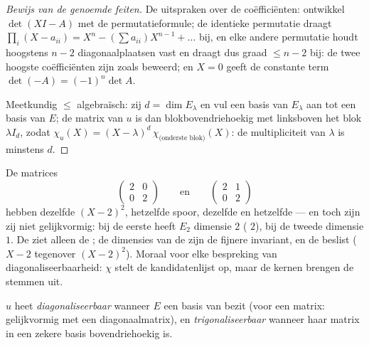 \begin{proof}[Bewijs van de genoemde feiten]
De uitspraken over de coëfficiënten: ontwikkel $\det(XI - A)$ met
de permutatieformule; de identieke permutatie draagt $\prod_i (X -
a_{ii}) = X^n - (\sum a_{ii})X^{n-1} + \dots$ bij, en elke andere
permutatie houdt hoogstens $n - 2$ diagonaalplaatsen vast en draagt
dus graad $\leq n - 2$ bij: de twee hoogste coëfficiënten zijn
zoals beweerd; en $X = 0$ geeft de constante term $\det(-A) =
(-1)^n\det A$.

Meetkundig $\leq$ algebraïsch: zij $d = \dim E_\lambda$ en vul een
basis van $E_\lambda$ aan tot een basis van $E$; de matrix van $u$
is dan blokbovendriehoekig met linksboven het blok $\lambda I_d$,
zodat $\chi_u(X) = (X - \lambda)^d\, \chi_{\text{(onderste
blok)}}(X)$: de multipliciteit van $\lambda$ is minstens $d$.
\end{proof}

\begin{example}\label{ex:b2:reduction:samechi}
De matrices
\[
\begin{pmatrix}2 & 0\\ 0 & 2\end{pmatrix}
\qquad\text{en}\qquad
\begin{pmatrix}2 & 1\\ 0 & 2\end{pmatrix}
\]
hebben dezelfde  $(X - 2)^2$, hetzelfde
spoor, dezelfde  en hetzelfde  --- en toch zijn
zij niet gelijkvormig: bij de eerste heeft $E_2$ dimensie $2$
( $2$), bij de tweede dimensie $1$. De
 ziet alleen de ; de dimensies van de  zijn de fijnere
invariant, en de  beslist ($X - 2$ tegenover $(X -
2)^2$). Moraal voor elke bespreking van diagonaliseerbaarheid:
$\chi$ stelt de kandidatenlijst op, maar de kernen brengen de
stemmen uit.
\end{example}

\begin{definition}\label{def:b2:reduction:diag}
$u$ heet \emph{diagonaliseerbaar} wanneer
$E$ een basis van  bezit (voor een matrix: gelijkvormig
met een diagonaalmatrix), en
\emph{trigonaliseerbaar} wanneer haar
matrix in een zekere basis bovendriehoekig is.
\end{definition}

